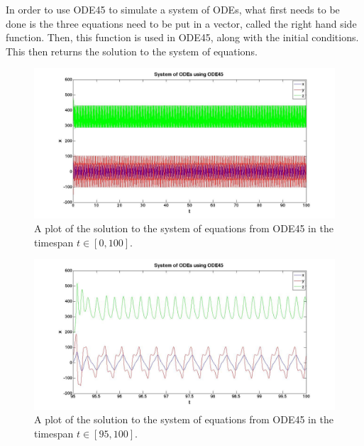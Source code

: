 \documentclass[a4paper]{article}
\begin{document}

In order to use ODE45 to simulate a system of ODEs, what first needs to be done is the three equations need to be put in a vector, called the right hand side function. Then, this function is used in ODE45, along with the initial conditions. This then returns the solution to the system of equations.


\begin{figure}[H]
\centering
\includegraphics[width=1\textwidth]{ode450to100.jpg}
\caption{\label{fig:ode450to100}A plot of the solution to the system of equations from ODE45 in the timespan $t \in [0, 100].$}
\end{figure}


\begin{figure}[H]
\centering
\includegraphics[width=1\textwidth]{ode4595to100.jpg}
\caption{\label{fig:ode4595to100}A plot of the solution to the system of equations from ODE45 in the timespan $t \in [95, 100].$}
\end{figure}

\end{document}

